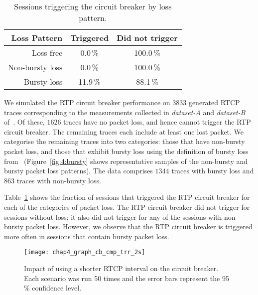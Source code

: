 \begin{table}
  \begin{center}
    \begin{tabular}{rcc}
    \toprule
      \textbf{Loss Pattern}   & \textbf{Triggered} & \textbf{Did not trigger} \\
    \midrule
             Loss free &   0.0\,\% & 100.0\,\% \\
       Non-bursty loss &   0.0\,\% & 100.0\,\% \\
          Bursty loss  &  11.9\,\% &  88.1\,\% \\
    \bottomrule
    \end{tabular}
    \caption{Sessions triggering the circuit breaker by loss pattern.}
    \label{tab:4:cb_bursty}
  \end{center}
\end{table}

We simulated the RTP circuit breaker performance on $3833$ generated RTCP traces
corresponding to the measurements collected in \emph{dataset-A} and
\emph{dataset-B} of~\cite{ellis:2011:dataset}. Of these, $1626$ traces have no
packet loss, and hence cannot trigger the RTP circuit breaker. The remaining
traces each include at least one lost packet. We categorise the remaining
traces into two categories: those that have non-bursty packet loss, and those
that exhibit bursty loss using the definition of bursty loss
from~\cite{rfc3611} (Figure~\ref{fig:4:bursty} shows representative samples of
the non-bursty and bursty packet loss patterns). The data comprises $1344$
traces with bursty loss and $863$ traces with non-bursty loss.



Table~\ref{tab:4:cb_bursty} shows the fraction of sessions that triggered the
RTP circuit breaker for each of the categories of packet loss. The RTP circuit
breaker did not trigger for sessions without loss; it also did not trigger for
any of the sessions with non-bursty packet loss. However, we observe that the
RTP circuit breaker is triggered more often in sessions that contain bursty
packet loss. 

\begin{figure}[!t]
  \centerline{
    {\texttt{[image: chap4\_graph\_cb\_cmp\_trr\_2s]}}
  }
  \caption{Impact of using a shorter RTCP interval on the
  circuit breaker. Each scenario was run 50 times and the error bars represent
  the 95\,\% confidence level.}
  \label{fig:4:short-rtcp}
\end{figure}

